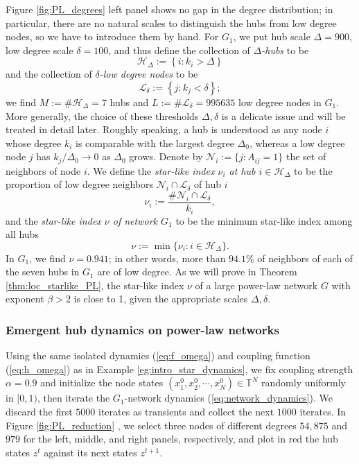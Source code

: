 \documentclass[a4paper]{article}
\theoremstyle{plain}
\theoremstyle{definition}
\newcommand{\T}{\mathbb{T}}
\newcommand{\Hil}{\mathcal{H}}
\newcommand{\Lil}{\mathcal{L}}
\newcommand{\Nil}{\mathcal{N}}
\begin{document}
Figure \ref{fig:PL_degrees} left panel shows no gap in the degree distribution; in particular, there are no natural scales to distinguish the hubs from low degree nodes, so we have to introduce them by hand. For $G_1$, we put hub scale $\Delta=900$, low degree scale $\delta=100$, and thus define the collection of \textit{$\Delta$-hubs} to be
$$\Hil_{\Delta}:=\left\{ i:  k_i>\Delta \right\}$$
and the collection of \textit{$\delta$-low degree nodes} to be
$$\Lil_{\delta}:= \left\{j:  k_j< \delta \right\};$$
we find $M:=\#\Hil_{\Delta}=7$ hubs and $L:=\#\Lil_{\delta}=995635$ low degree nodes in $G_1$. More generally, the choice of these thresholds $\Delta,\delta$ is a delicate issue and will be treated in detail later. Roughly speaking, a hub is understood as any node $i$ whose degree $k_i$ is comparable with the largest degree $\Delta_0$, whereas a low degree node $j$ has $k_j/\Delta_0 \rightarrow 0$ as  $\Delta_0$ grows.
Denote by $\Nil_i:=\{j: A_{ij}=1\}$ the set of neighbors of node $i$. We define the \textit{star-like index $\nu_i$ at hub $i\in\Hil_{\Delta}$} to be the proportion of low degree neighbors $\Nil_i\cap\Lil_{\delta}$ of hub $i$
$$\nu_i:= \frac{\#\Nil_i\cap\Lil_{\delta}}{ k_i},$$
and the \textit{star-like index $\nu$ of network $G_1$} to be the minimum star-like index among all hubs
\[
\nu:= \min\{\nu_i:i\in\Hil_{\Delta}\}.
\]
In $G_1$, we find $\nu=0.941$; in other words, more than $94.1\%$ of neighbors of each of the seven hubs in $G_1$ are of low degree. As we will prove in Theorem \ref{thm:loc_starlike_PL}, the star-like index $\nu$ of a large power-law network $G$ with exponent $\beta>2$ is close to 1, given the appropriate scales $\Delta,\delta$. %




\subsubsection{Emergent hub dynamics on power-law networks} \label{sec:emergent_PLhub_dynamics}
Using the same isolated dynamics (\ref{eq:f_omega}) and coupling function (\ref{eq:h_omega}) as in Example \ref{eg:intro_star_dynamics}, we fix coupling strength $\alpha=0.9$ and initialize the node states $(x_1^0,x_2^0,\cdots,x_N^0)\in \T^N$ randomly uniformly in $[0,1)$, then iterate the $G_1$-network dynamics (\ref{eq:network_dynamics}). We discard the first $5000$ iterates as transients and collect the next $1000$ iterates. %
In Figure \ref{fig:PL_reduction} , we select three nodes of different degrees $54,875$ and $979$ for the left, middle, and right panels, respectively, and plot in red the hub states $z^t$ against its next states $z^{t+1}$. 
\end{document}
